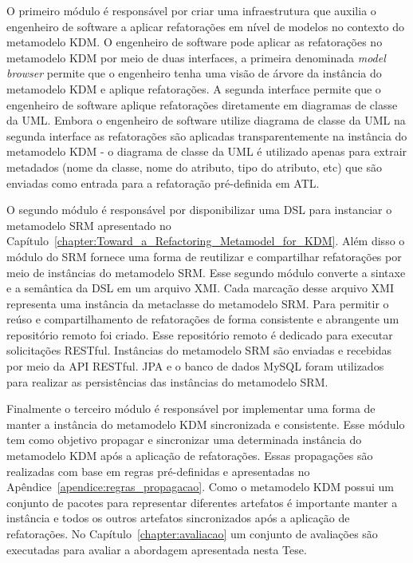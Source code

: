 O primeiro módulo é responsável por criar uma infraestrutura que auxilia o engenheiro de software a aplicar refatorações em nível de modelos no contexto do metamodelo KDM. O engenheiro de software pode aplicar as refatorações no metamodelo KDM por meio de duas interfaces, a primeira denominada \textit{model browser} permite que o engenheiro tenha uma visão de árvore da instância do metamodelo KDM e aplique refatorações. A segunda interface permite que o engenheiro de software aplique refatorações diretamente em diagramas de classe da UML. Embora o engenheiro de software utilize diagrama de classe da UML na segunda interface as refatorações são aplicadas transparentemente na instância do metamodelo KDM - o diagrama de classe da UML é utilizado apenas para extrair metadados (nome da classe, nome do atributo, tipo do atributo, etc) que são enviadas como entrada para a refatoração pré-definida em ATL.

O segundo módulo é responsável por disponibilizar uma DSL para instanciar o metamodelo SRM apresentado no Capítulo~\ref{chapter:Toward_a_Refactoring_Metamodel_for_KDM}. Além disso o módulo do SRM fornece uma forma de reutilizar e compartilhar refatorações por meio de instâncias do metamodelo SRM. Esse segundo módulo converte a sintaxe e a semântica da DSL em um arquivo XMI. Cada marcação desse arquivo XMI representa uma instância da metaclasse do metamodelo SRM. Para permitir o reúso e compartilhamento de refatorações de forma consistente e abrangente um repositório remoto foi criado. Esse repositório remoto é dedicado para executar solicitações RESTful. Instâncias do metamodelo SRM são enviadas e recebidas por meio da API RESTful. JPA e o banco de dados MySQL foram utilizados para realizar as persistências das instâncias do metamodelo SRM.

Finalmente o terceiro módulo é responsável por implementar uma forma de manter a instância do metamodelo KDM sincronizada e consistente. Esse módulo tem como objetivo propagar e sincronizar uma determinada instância do metamodelo KDM após a aplicação de refatorações. Essas propagações são realizadas com base em regras pré-definidas e apresentadas no Apêndice~\ref{apendice:regras_propagacao}. Como o metamodelo KDM possui um conjunto de pacotes para representar diferentes artefatos é importante manter a instância e todos os outros artefatos sincronizados após a aplicação de refatorações. No Capítulo~\ref{chapter:avaliacao} um conjunto de avaliações são executadas para avaliar a abordagem apresentada nesta Tese.